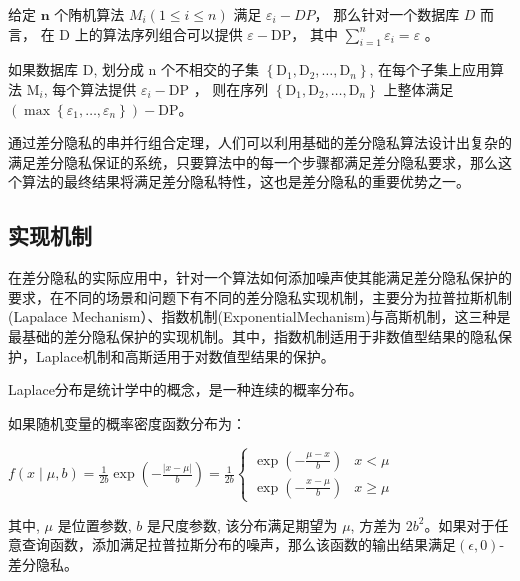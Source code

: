 \begin{theorem}[串行组合]\label{串行组合}
给定 $\mathbf{n}$ 个陏机算法 $M_{i}(1 \leq i \leq n)$ 满足 $\varepsilon_{i}-DP$， 那么针对一个数据库 $D$ 而言， 在 $\mathrm{D}$ 上的算法序列组合可以提供 $\varepsilon-\mathrm{DP}$， 其中 $\sum_{i=1}^{n} \varepsilon_{i}=\varepsilon$ 。
\end{theorem}

\begin{theorem}[并行组合]\label{并行组合}
如果数据库 $\mathrm{D}$, 划分成 $\mathrm{n}$ 个不相交的子集 $\left\{\mathrm{D}_{1}, \mathrm{D}_{2}, \ldots, \mathrm{D}_{n}\right\}$, 在每个子集上应用算法 $\mathrm{M}_{i}$, 每个算法提供 $\varepsilon_{i}-\mathrm{DP}$ ， 则在序列 $\left\{\mathrm{D}_{1}, \mathrm{D}_{2}, \ldots, \mathrm{D}_{n}\right\}$ 上整体满足 $\left(\max \left\{\varepsilon_{1}, \ldots, \varepsilon_{n}\right\}\right)-\mathrm{DP}$。
\end{theorem}

通过差分隐私的串并行组合定理，人们可以利用基础的差分隐私算法设计出复杂的满足差分隐私保证的系统，只要算法中的每一个步骤都满足差分隐私要求，那么这个算法的最终结果将满足差分隐私特性，这也是差分隐私的重要优势之一。 

\subsection{实现机制}
在差分隐私的实际应用中，针对一个算法如何添加噪声使其能满足差分隐私保护的要求，在不同的场景和问题下有不同的差分隐私实现机制，主要分为拉普拉斯机制(Lapalace Mechanism）、指数机制(ExponentialMechanism)与高斯机制，这三种是最基础的差分隐私保护的实现机制。其中，指数机制适用于非数值型结果的隐私保护，Laplace机制和高斯适用于对数值型结果的保护。

Laplace分布是统计学中的概念，是一种连续的概率分布。

\begin{theorem}[拉普拉斯分布]\label{拉普拉斯分布}
如果随机变量的概率密度函数分布为：

$f(x \mid \mu, b)=\frac{1}{2 b} \exp \left(-\frac{|x-\mu|}{b}\right)=\frac{1}{2 b}\left\{\begin{array}{ll}\exp \left(-\frac{\mu-x}{b}\right) & x<\mu \\ \exp \left(-\frac{x-\mu}{b}\right) & x \geq \mu\end{array}\right.$
\end{theorem}

其中, $\mu$ 是位置参数, $b$ 是尺度参数, 该分布满足期望为 $\mu$, 方差为 $2 b^{2}$。如果对于任意查询函数，添加满足拉普拉斯分布的噪声，那么该函数的输出结果满足$(\epsilon, 0)$-差分隐私。

